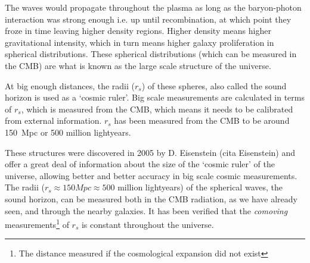 The waves would propagate throughout the plasma as long as the baryon-photon interaction was strong enough i.e. up until recombination, at which point they froze in time leaving higher density regions. Higher density means higher gravitational intensity, which in turn means higher galaxy proliferation in spherical distributions. These spherical distributions (which can be measured in the CMB) are what is known as the large scale structure of the universe.

At big enough distances, the radii ($r_s$) of these spheres, also called the sound horizon is used as a `cosmic ruler'. Big scale measurements are calculated in terms of $r_s$, which is measured from the CMB, which means it needs to be calibrated from external information. $ r_s$ has been measured from the CMB to be around  \SI{150}{Mpc} or 500 million lightyears.

These structures were discovered in 2005 by D. Eisenstein (cita Eisenstein) and offer a great deal  of information about the size of the `cosmic ruler' of the universe, allowing better and better accuracy in big scale cosmic measurements. The radii ($r_s \approx 150 Mpc \approx 500 $ million lightyears) of the spherical waves, the sound horizon, can be measured both in the CMB radiation, as we have already seen, and through the nearby galaxies. It has been verified that the \textit{comoving} measurements\footnote{The distance measured if the cosmological expansion did not exist} of $r_s$ is constant throughout the universe.



